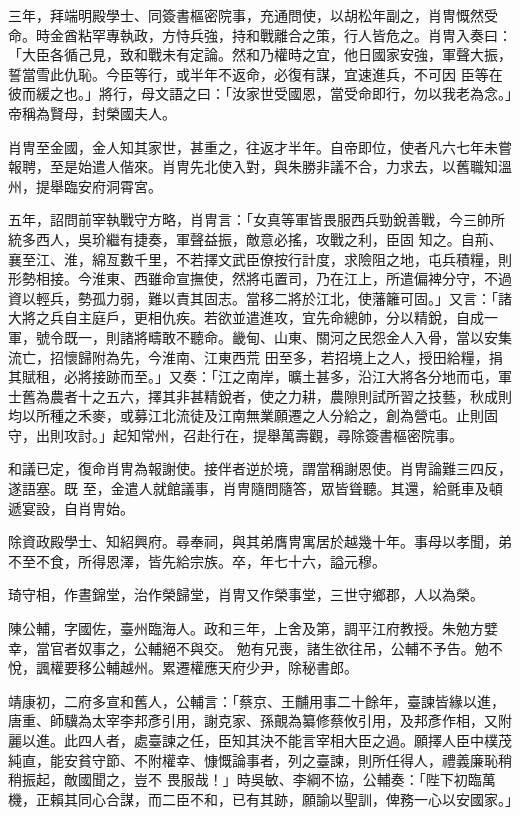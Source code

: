 \begin{pinyinscope}
 三年，拜端明殿學士、同簽書樞密院事，充通問使，以胡松年副之，肖冑慨然受命。時金酋粘罕專執政，方恃兵強，持和戰離合之策，行人皆危之。肖冑入奏曰：「大臣各循己見，致和戰未有定論。然和乃權時之宜，他日國家安強，軍聲大振，誓當雪此仇恥。今臣等行，或半年不返命，必復有謀，宜速進兵，不可因
 臣等在彼而緩之也。」將行，母文語之曰：「汝家世受國恩，當受命即行，勿以我老為念。」帝稱為賢母，封榮國夫人。



 肖冑至金國，金人知其家世，甚重之，往返才半年。自帝即位，使者凡六七年未嘗報聘，至是始遣人偕來。肖冑先北使入對，與朱勝非議不合，力求去，以舊職知溫州，提舉臨安府洞霄宮。



 五年，詔問前宰執戰守方略，肖冑言：「女真等軍皆畏服西兵勁銳善戰，今三帥所統多西人，吳玠繼有捷奏，軍聲益振，敵意必搖，攻戰之利，臣固
 知之。自荊、襄至江、淮，綿亙數千里，不若擇文武臣僚按行計度，求險阻之地，屯兵積糧，則形勢相接。今淮東、西雖命宣撫使，然將屯置司，乃在江上，所遣偏裨分守，不過資以輕兵，勢孤力弱，難以責其固志。當移二將於江北，使藩籬可固。」又言：「諸大將之兵自主庭戶，更相仇疾。若欲並遣進攻，宜先命總帥，分以精銳，自成一軍，號令既一，則諸將疇敢不聽命。畿甸、山東、關河之民怨金人入骨，當以安集流亡，招懷歸附為先，今淮南、江東西荒
 田至多，若招境上之人，授田給糧，捐其賦租，必將接跡而至。」又奏：「江之南岸，曠土甚多，沿江大將各分地而屯，軍士舊為農者十之五六，擇其非甚精銳者，使之力耕，農隙則試所習之技藝，秋成則均以所種之禾麥，或募江北流徒及江南無業願遷之人分給之，創為營屯。止則固守，出則攻討。」起知常州，召赴行在，提舉萬壽觀，尋除簽書樞密院事。



 和議已定，復命肖冑為報謝使。接伴者逆於境，謂當稱謝恩使。肖冑論難三四反，遂語塞。既
 至，金遣人就館議事，肖冑隨問隨答，眾皆聳聽。其還，給氈車及頓遞宴設，自肖冑始。



 除資政殿學士、知紹興府。尋奉祠，與其弟膺冑寓居於越幾十年。事母以孝聞，弟不至不食，所得恩澤，皆先給宗族。卒，年七十六，謚元穆。



 琦守相，作晝錦堂，治作榮歸堂，肖冑又作榮事堂，三世守鄉郡，人以為榮。



 陳公輔，字國佐，臺州臨海人。政和三年，上舍及第，調平江府教授。朱勉方嬖幸，當官者奴事之，公輔絕不與交。
 勉有兄喪，諸生欲往吊，公輔不予告。勉不悅，諷權要移公輔越州。累遷權應天府少尹，除秘書郎。



 靖康初，二府多宣和舊人，公輔言：「蔡京、王黼用事二十餘年，臺諫皆緣以進，唐重、師驥為太宰李邦彥引用，謝克家、孫覿為纂修蔡攸引用，及邦彥作相，又附麗以進。此四人者，處臺諫之任，臣知其決不能言宰相大臣之過。願擇人臣中樸茂純直，能安貧守節、不附權幸、慷慨論事者，列之臺諫，則所任得人，禮義廉恥稍稍振起，敵國聞之，豈不
 畏服哉！」時吳敏、李綱不協，公輔奏：「陛下初臨萬機，正賴其同心合謀，而二臣不和，已有其跡，願諭以聖訓，俾務一心以安國家。」




\end{pinyinscope}
